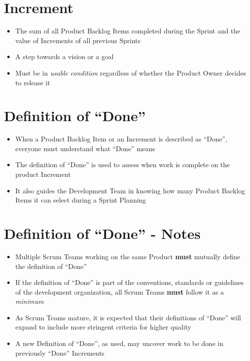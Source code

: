 \documentclass[a4paper,11pt,twocolumn]{article}
\begin{document}
\section*{Increment}
\begin{itemize}
	\item The sum of all Product Backlog Items completed during the Sprint and the value of Increments of all previous Sprints
	\item A step towards a vision or a goal
	\item Must be in \textit{usable condition} regardless of whether the Product Owner decides to release it
\end{itemize}

\section*{Definition of ``Done''}
\begin{itemize}
	\item When a Product Backlog Item or an Increment is described as ``Done'', everyone must understand what ``Done'' means
	\item The definition of ``Done'' is used to assess when work is complete on the product Increment
    \item It also guides the Development Team in knowing how many Product Backlog Items it can select during a Sprint Planning
\end{itemize}

\section*{Definition of ``Done'' - Notes}
\begin{itemize}
    \item Multiple Scrum Teams working on the same Product \textbf{must} mutually define the definition of ``Done''
    \item If the definition of ``Done'' is part of the conventions, standards or guidelines of the development organization, all Scrum Teams \textbf{must} follow it as a \textit{minimum}
	\item As Scrum Teams mature, it is expected that their definitions of ``Done'' will expand to include more stringent criteria for higher quality
	\item A new Definition of ``Done'', as used, may uncover work to be done in previously ``Done'' Increments
\end{itemize}
\end{document}
